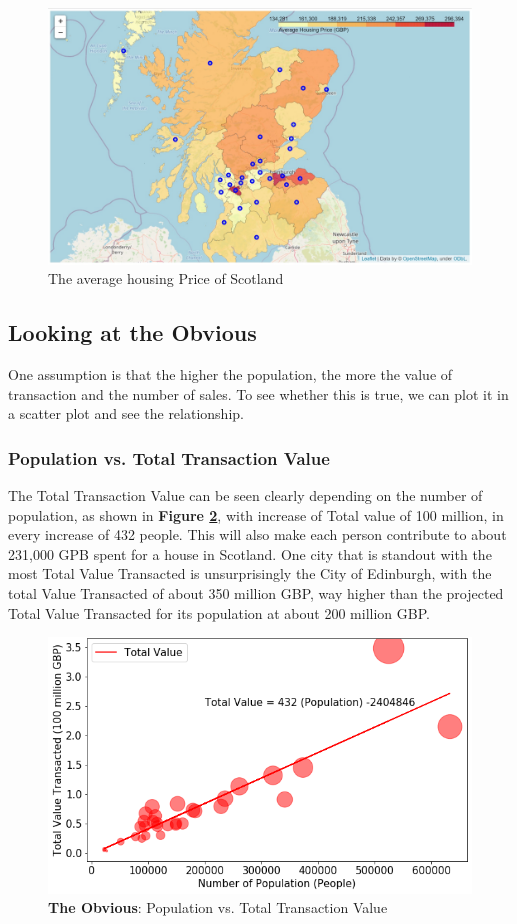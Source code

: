 \documentclass{homeworg}
\begin{document}
\begin{figure}[!h]
    \centering
    \includegraphics[scale=0.7]{figure/Figure_2_Average_Housing_Price_Map.jpg}
    \caption{The average housing Price of Scotland}
    \label{fig:fig2}
\end{figure}
\FloatBarrier
\subsection{Looking at the Obvious}
One assumption is that the higher the population, the more the value of transaction and the number of sales. To see whether this is true, we can plot it in a scatter plot and see the relationship.
\subsubsection{Population vs. Total Transaction Value}
The Total Transaction Value can be seen clearly depending on the number of population, as shown in \textbf{Figure \ref{fig:fig3}}, with increase of Total value of 100 million, in every increase of 432 people. This will also make each person contribute to about 231,000 GPB spent for a house in Scotland. One city that is standout with the most Total Value Transacted is unsurprisingly the City of Edinburgh, with the total Value Transacted of about 350 million GBP, way higher than the projected Total Value Transacted for its population at about 200 million GBP.
\begin{figure}[!h]
    \centering
    \includegraphics[scale=0.6]{figure/Figure_3_The_Obvious_PopulationVSTotalValue.png}
    \caption{\textbf{The Obvious}: Population vs. Total Transaction
    Value}
    \label{fig:fig3}
\end{figure}
\FloatBarrier
\end{document}
